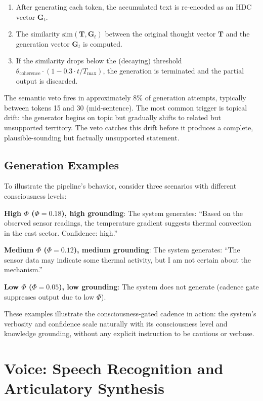 \documentclass[12pt]{book}
\begin{document}
\begin{enumerate}
  \item After generating each token, the accumulated text is re-encoded as an HDC vector $\mathbf{G}_t$.
  \item The similarity $\text{sim}(\mathbf{T}, \mathbf{G}_t)$ between the original thought vector $\mathbf{T}$ and the generation vector $\mathbf{G}_t$ is computed.
  \item If the similarity drops below the (decaying) threshold $\theta_{\text{coherence}} \cdot (1 - 0.3 \cdot t/T_{\text{max}})$, the generation is terminated and the partial output is discarded.
\end{enumerate}

The semantic veto fires in approximately 8\% of generation attempts, typically between tokens 15 and 30 (mid-sentence). The most common trigger is topical drift: the generator begins on topic but gradually shifts to related but unsupported territory. The veto catches this drift before it produces a complete, plausible-sounding but factually unsupported statement.

\section{Generation Examples}

To illustrate the pipeline's behavior, consider three scenarios with different consciousness levels:

\textbf{High $\Phi$ ($\Phi = 0.18$), high grounding}: The system generates: ``Based on the observed sensor readings, the temperature gradient suggests thermal convection in the east sector. Confidence: high.''

\textbf{Medium $\Phi$ ($\Phi = 0.12$), medium grounding}: The system generates: ``The sensor data may indicate some thermal activity, but I am not certain about the mechanism.''

\textbf{Low $\Phi$ ($\Phi = 0.05$), low grounding}: The system does not generate (cadence gate suppresses output due to low $\Phi$).

These examples illustrate the consciousness-gated cadence in action: the system's verbosity and confidence scale naturally with its consciousness level and knowledge grounding, without any explicit instruction to be cautious or verbose.


\chapter{Voice: Speech Recognition and Articulatory Synthesis}
\label{ch:voice}
\end{document}
